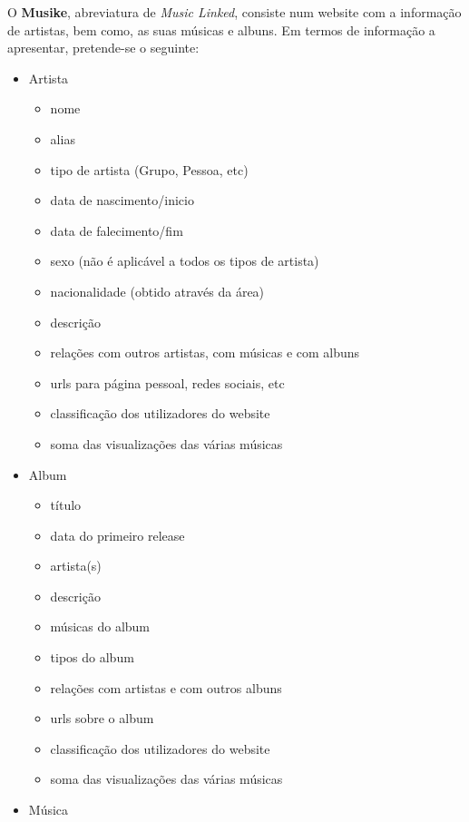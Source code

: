 \documentclass{article}
\begin{document}
O \textbf{Musike}, abreviatura de \textit{Music Linked}, consiste num website com a informação de artistas, bem como, as suas músicas e albuns. Em termos de informação a apresentar, pretende-se o seguinte:
\begin{itemize}
    \item Artista
        \begin{itemize}
            \item nome
            \item alias
            \item tipo de artista (Grupo, Pessoa, etc)
            \item data de nascimento/inicio
            \item data de falecimento/fim
            \item sexo (não é aplicável a todos os tipos de artista)
            \item nacionalidade (obtido através da área)
            \item descrição
            \item relações com outros artistas, com músicas e com albuns
            \item urls para página pessoal, redes sociais, etc
            \item classificação dos utilizadores do website
            \item soma das visualizações das várias músicas
        \end{itemize}
    \item Album
        \begin{itemize}
            \item título
            \item data do primeiro release
            \item artista(s)
            \item descrição
            \item músicas do album
            \item tipos do album
            \item relações com artistas e com outros albuns
            \item urls sobre o album
            \item classificação dos utilizadores do website
            \item soma das visualizações das várias músicas
        \end{itemize}
    \item Música
        \begin{itemize}

\end{itemize}
\end{itemize}
\end{document}
